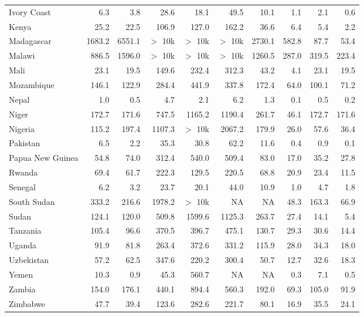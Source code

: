 \begin{table}[b]
{\begin{tabular}[t]{lrrrrrrrrr}
Ivory Coast & 6.3 & 3.8 & 28.6 & 18.1 & 49.5 & 10.1 & 1.1 & 2.1 & 0.6\\
Kenya & 25.2 & 22.5 & 106.9 & 127.0 & 162.2 & 36.6 & 6.4 & 5.4 & 2.2\\
Madagascar & 1683.2 & 6551.1 & $>$ 10k & $>$ 10k & $>$ 10k & 2730.1 & 582.8 & 87.7 & 53.4\\
Malawi & 886.5 & 1596.0 & $>$ 10k & $>$ 10k & $>$ 10k & 1260.5 & 287.0 & 319.5 & 223.4\\
Mali & 23.1 & 19.5 & 149.6 & 232.4 & 312.3 & 43.2 & 4.1 & 23.1 & 19.5\\
Mozambique & 146.1 & 122.9 & 284.4 & 441.9 & 337.8 & 172.4 & 64.0 & 100.1 & 71.2\\
Nepal & 1.0 & 0.5 & 4.7 & 2.1 & 6.2 & 1.3 & 0.1 & 0.5 & 0.2\\
Niger & 172.7 & 171.6 & 747.5 & 1165.2 & 1190.4 & 261.7 & 46.1 & 172.7 & 171.6\\
Nigeria & 115.2 & 197.4 & 1107.3 & $>$ 10k & 2067.2 & 179.9 & 26.0 & 57.6 & 36.4\\
Pakistan & 6.5 & 2.2 & 35.3 & 30.8 & 62.2 & 11.6 & 0.4 & 0.9 & 0.1\\
Papua New Guinea & 54.8 & 74.0 & 312.4 & 540.0 & 509.4 & 83.0 & 17.0 & 35.2 & 27.8\\
Rwanda & 69.4 & 61.7 & 222.3 & 129.5 & 220.5 & 68.8 & 20.9 & 23.4 & 11.5\\
Senegal & 6.2 & 3.2 & 23.7 & 20.1 & 44.0 & 10.9 & 1.0 & 4.7 & 1.8\\
South Sudan & 333.2 & 216.6 & 1978.2 & $>$ 10k & NA & NA & 48.3 & 163.3 & 66.9\\
Sudan & 124.1 & 120.0 & 509.8 & 1599.6 & 1125.3 & 263.7 & 27.4 & 14.1 & 5.4\\
Tanzania & 105.4 & 96.6 & 370.5 & 396.7 & 475.1 & 130.7 & 29.3 & 30.6 & 14.4\\
Uganda & 91.9 & 81.8 & 263.4 & 372.6 & 331.2 & 115.9 & 28.0 & 34.3 & 18.0\\
Uzbekistan & 57.2 & 62.5 & 347.6 & 220.2 & 300.4 & 50.7 & 12.7 & 32.6 & 18.3\\
Yemen & 10.3 & 0.9 & 45.3 & 560.7 & NA & NA & 0.3 & 7.1 & 0.5\\
Zambia & 154.0 & 176.1 & 440.1 & 894.4 & 560.3 & 192.0 & 69.3 & 105.0 & 91.9\\
Zimbabwe & 47.7 & 39.4 & 123.6 & 282.6 & 221.7 & 80.1 & 16.9 & 35.5 & 24.1\\
\bottomrule
\end{tabular}}
\end{table}